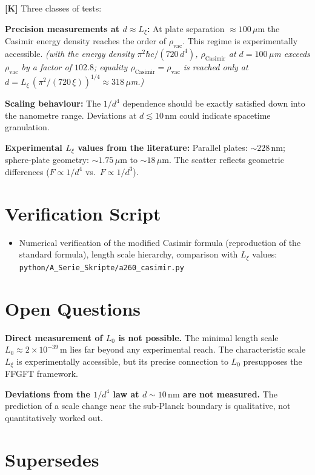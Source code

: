 \textbf{[K]} Three classes of tests:

\textbf{Precision measurements at $d\approx L_\xi$:} At plate separation
$\approx100\,\mu$m the Casimir energy density reaches the order of $\rho_\text{vac}$.
This regime is experimentally accessible. \textit{(with the energy density $\pi^2\hbar c/(720\,d^4)$, $\rho_\text{Casimir}$ at $d=100\,\mu$m exceeds $\rho_\text{vac}$ by a factor of $102{.}8$; equality $\rho_\text{Casimir}=\rho_\text{vac}$ is reached only at $d = L_\xi\,(\pi^2/(720\,\xi))^{1/4} \approx 318\,\mu$m.)}

\textbf{Scaling behaviour:} The $1/d^4$ dependence should be exactly satisfied
down into the nanometre range. Deviations at $d\lesssim10\,\text{nm}$ could
indicate spacetime granulation.

\textbf{Experimental $L_\xi$ values from the literature:} Parallel plates:
$\sim228\,\text{nm}$; sphere-plate geometry: $\sim1{.}75\,\mu\text{m}$ to
$\sim18\,\mu\text{m}$. The scatter reflects geometric differences
($F\propto1/d^4$ vs.\ $F\propto1/d^3$).

\section{Verification Script}

\begin{itemize}[leftmargin=2em,itemsep=2pt,topsep=2pt]
  \item Numerical verification of the modified Casimir formula (reproduction of
    the standard formula), length scale hierarchy, comparison with $L_\xi$ values:
    \texttt{python/A\_Serie\_Skripte/a260\_casimir.py}
\end{itemize}

\section{Open Questions}

\textbf{Direct measurement of $L_0$ is not possible.} The minimal length scale
$L_0\approx2\times10^{-39}\,\text{m}$ lies far beyond any experimental reach.
The characteristic scale $L_\xi$ is experimentally accessible, but its precise
connection to $L_0$ presupposes the FFGFT framework.

\textbf{Deviations from the $1/d^4$ law at $d\sim10\,\text{nm}$ are not measured.}
The prediction of a scale change near the sub-Planck boundary is qualitative,
not quantitatively worked out.

\section{Supersedes}

